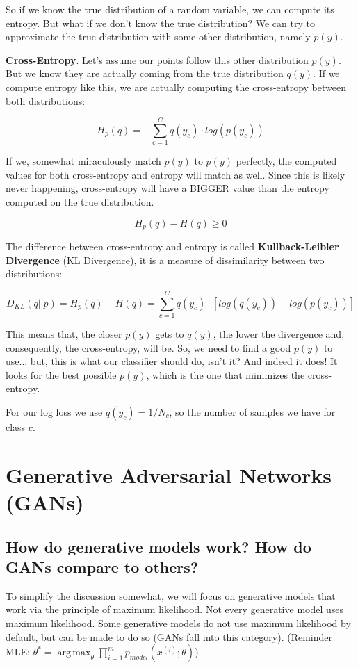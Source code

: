 \documentclass{scrartcl}
\DeclareMathOperator*{\argmax}{arg\,max}
\begin{document}
So if we know the true distribution of a random variable, we can compute its entropy. But what if we don't know the true distribution? We can try to approximate the true distribution with some other distribution, namely $p(y)$.

\textbf{Cross-Entropy}. Let's assume our points follow this other distribution $p(y)$. But we know they are actually coming from the true distribution $q(y)$. If we compute entropy like this, we are actually computing the cross-entropy between both distributions:

$$H_p(q) = - \sum_{c=1}^C q(y_c) \cdot log(p(y_c))$$

If we, somewhat miraculously match $p(y)$ to $p(y)$ perfectly, the computed values for both cross-entropy and entropy will match as well. Since this is likely never happening, cross-entropy will have a BIGGER value than the entropy computed on the true distribution.

$$H_p(q) - H(q) \geq 0$$

The difference between cross-entropy and entropy is called \textbf{Kullback-Leibler Divergence} (KL Divergence), it is a measure of dissimilarity between two distributions:

$$D_{KL}(q||p) = H_p(q) - H(q) = \sum_{c=1}^C q(y_c) \cdot [log(q(y_c)) - log(p(y_c))]$$

This means that, the closer $p(y)$ gets to $q(y)$, the lower the divergence and, consequently, the cross-entropy, will be. So, we need to find a good $p(y)$ to use... but, this is what our classifier should do, isn't it? And indeed it does! It looks for the best possible $p(y)$, which is the one that minimizes the cross-entropy.

For our log loss we use $q(y_c) = 1/N_c$, so the number of samples we have for class $c$.

\section[Generative Adversarial Networks (GANs)]{Generative Adversarial Networks (GANs) \cite{goodfellow2016nips}}
\subsection{How do generative models work? How do GANs compare to others?}
To simplify the discussion somewhat, we will focus on generative models that
work via the principle of maximum likelihood. Not every generative model
uses maximum likelihood. Some generative models do not use maximum likelihood by default, but can be made to do so (GANs fall into this category). (Reminder MLE: $\theta^* = \argmax_{\theta} \prod_{i=1}^m p_{model}(x^{(i)}; \theta)$).
\end{document}

